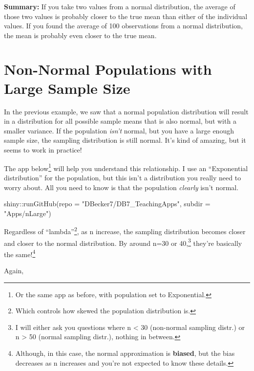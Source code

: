 \documentclass[
  letterpaper,
  DIV=11,
  numbers=noendperiod]{scrreprt}
\newenvironment{Shaded}{\begin{snugshade}}{\end{snugshade}}
\newcommand{\AttributeTok}[1]{\textcolor[rgb]{0.40,0.45,0.13}{#1}}
\newcommand{\FunctionTok}[1]{\textcolor[rgb]{0.28,0.35,0.67}{#1}}
\newcommand{\NormalTok}[1]{\textcolor[rgb]{0.00,0.23,0.31}{#1}}
\newcommand{\SpecialCharTok}[1]{\textcolor[rgb]{0.37,0.37,0.37}{#1}}
\newcommand{\StringTok}[1]{\textcolor[rgb]{0.13,0.47,0.30}{#1}}
\begin{document}
\textbf{Summary:} If you take two values from a normal distribution, the
average of those two values is probably closer to the true mean than
either of the individual values. If you found the average of 100
observations from a normal distribution, the mean is probably even
closer to the true mean.

\hypertarget{non-normal-populations-with-large-sample-size}{%
\section{Non-Normal Populations with Large Sample
Size}\label{non-normal-populations-with-large-sample-size}}

In the previous example, we saw that a normal population distribution
will result in a distribution for all possible sample means that is also
normal, but with a smaller variance. If the population \emph{isn't}
normal, but you have a large enough sample size, the sampling
distribution is still normal. It's kind of amazing, but it seems to work
in practice!

The app below\footnote{Or the same app as before, with population set to
  Exponential.} will help you understand this relationship. I use an
``Exponential distribution'' for the population, but this isn't a
distribution you really need to worry about. All you need to know is
that the population \emph{clearly} isn't normal.

\begin{Shaded}
\begin{Highlighting}[]
\NormalTok{shiny}\SpecialCharTok{::}\FunctionTok{runGitHub}\NormalTok{(}\AttributeTok{repo =} \StringTok{"DBecker7/DB7\_TeachingApps"}\NormalTok{, }
    \AttributeTok{subdir =} \StringTok{"Apps/nLarge"}\NormalTok{)}
\end{Highlighting}
\end{Shaded}

Regardless of ``lambda''\footnote{Which controls how skewed the
  population distribution is.}, as n increase, the sampling distribution
becomes closer and closer to the normal distribution. By around n=30 or
40,\footnote{I will either ask you questions where n \textless{} 30
  (non-normal sampling distr.) or n \textgreater{} 50 (normal sampling
  distr.), nothing in between.} they're basically the same!\footnote{Although,
  in this case, the normal approximation is \textbf{biased}, but the
  bias decreases as n increases and you're not expected to know these
  details.}

Again,
\end{document}
